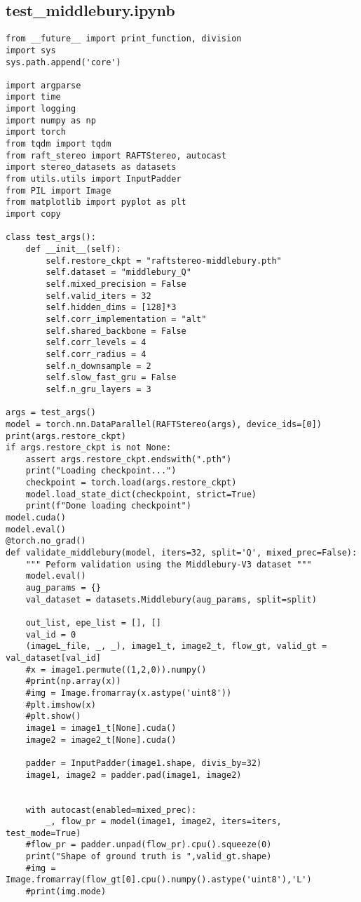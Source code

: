 \subsection*{test\_middlebury.ipynb}
\begin{verbatim}
from __future__ import print_function, division
import sys
sys.path.append('core')

import argparse
import time
import logging
import numpy as np
import torch
from tqdm import tqdm
from raft_stereo import RAFTStereo, autocast
import stereo_datasets as datasets
from utils.utils import InputPadder
from PIL import Image
from matplotlib import pyplot as plt
import copy

class test_args():
    def __init__(self):
        self.restore_ckpt = "raftstereo-middlebury.pth"
        self.dataset = "middlebury_Q"
        self.mixed_precision = False
        self.valid_iters = 32
        self.hidden_dims = [128]*3
        self.corr_implementation = "alt"
        self.shared_backbone = False
        self.corr_levels = 4
        self.corr_radius = 4
        self.n_downsample = 2
        self.slow_fast_gru = False
        self.n_gru_layers = 3

args = test_args()
model = torch.nn.DataParallel(RAFTStereo(args), device_ids=[0])
print(args.restore_ckpt)
if args.restore_ckpt is not None:
    assert args.restore_ckpt.endswith(".pth")
    print("Loading checkpoint...")
    checkpoint = torch.load(args.restore_ckpt)
    model.load_state_dict(checkpoint, strict=True)
    print(f"Done loading checkpoint")
model.cuda()
model.eval()
@torch.no_grad()
def validate_middlebury(model, iters=32, split='Q', mixed_prec=False):
    """ Peform validation using the Middlebury-V3 dataset """
    model.eval()
    aug_params = {}
    val_dataset = datasets.Middlebury(aug_params, split=split)

    out_list, epe_list = [], []
    val_id = 0
    (imageL_file, _, _), image1_t, image2_t, flow_gt, valid_gt = val_dataset[val_id]
    #x = image1.permute((1,2,0)).numpy()
    #print(np.array(x))
    #img = Image.fromarray(x.astype('uint8'))
    #plt.imshow(x)
    #plt.show()
    image1 = image1_t[None].cuda()
    image2 = image2_t[None].cuda()

    padder = InputPadder(image1.shape, divis_by=32)
    image1, image2 = padder.pad(image1, image2)


    with autocast(enabled=mixed_prec):
        _, flow_pr = model(image1, image2, iters=iters, test_mode=True)
    #flow_pr = padder.unpad(flow_pr).cpu().squeeze(0)
    print("Shape of ground truth is ",valid_gt.shape)
    #img = Image.fromarray(flow_gt[0].cpu().numpy().astype('uint8'),'L')
    #print(img.mode)


\end{verbatim}
